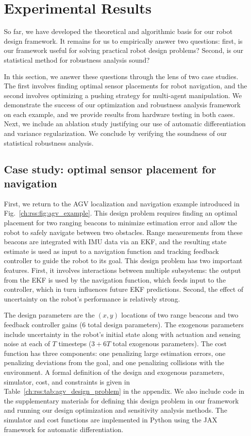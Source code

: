 \section{Experimental Results}\label{ch:rss:cases}

So far, we have developed the theoretical and algorithmic basis for our robot design framework. It remains for us to empirically answer two questions: first, is our framework useful for solving practical robot design problems? Second, is our statistical method for robustness analysis sound?

In this section, we answer these questions through the lens of two case studies. The first involves finding optimal sensor placements for robot navigation, and the second involves optimizing a pushing strategy for multi-agent manipulation. We demonstrate the success of our optimization and robustness analysis framework on each example, and we provide results from hardware testing in both cases. Next, we include an ablation study justifying our use of automatic differentiation and variance regularization. We conclude by verifying the soundness of our statistical robustness analysis.

\subsection{Case study: optimal sensor placement for navigation}\label{ch:rss:case1}

First, we return to the AGV localization and navigation example introduced in Fig.~\ref{ch:rss:fig:agv_example}. This design problem requires finding an optimal placement for two ranging beacons to minimize estimation error and allow the robot to safely navigate between two obstacles. Range measurements from these beacons are integrated with IMU data via an EKF, and the resulting state estimate is used as input to a navigation function and tracking feedback controller to guide the robot to its goal. This design problem has two important features. First, it involves interactions between multiple subsystems: the output from the EKF is used by the navigation function, which feeds input to the controller, which in turn influences future EKF predictions. Second, the effect of uncertainty on the robot's performance is relatively strong.

The design parameters are the $(x, y)$ locations of two range beacons and two feedback controller gains (6 total design parameters). The exogenous parameters include uncertainty in the robot's initial state along with actuation and sensing noise at each of $T$ timesteps ($3 + 6T$ total exogenous parameters). The cost function has three components: one penalizing large estimation errors, one penalizing deviations from the goal, and one penalizing collisions with the environment. A formal definition of the design and exogenous parameters, simulator, cost, and constraints is given in Table~\ref{ch:rss:tab:agv_design_problem} in the appendix. We also include code in the supplementary materials for defining this design problem in our framework and running our design optimization and sensitivity analysis methods. The simulator and cost functions are implemented in Python using the JAX framework for automatic differentiation.

